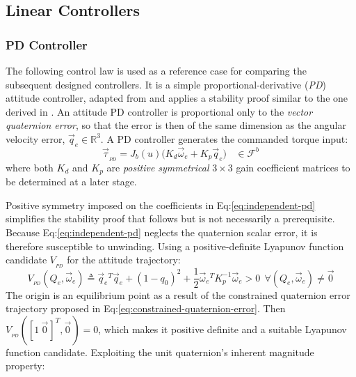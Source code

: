 \subsection{Linear Controllers}
\label{subsec:control.attitude.controllers}
\subsubsection{PD Controller}
\label{subsubsec:control.attitude.controllers.pd}
The following control law is used as a reference case for comparing the subsequent designed controllers. It is a simple proportional-derivative (\emph{PD}) attitude controller, adapted from \cite{fullquaternion} and applies a stability proof similar to the one derived in \cite{attitudecontrolproblem}. An attitude PD controller is proportional only to the \emph{vector quaternion error}, so that the error is then of the same dimension as the angular velocity error, $\vec{q}_e\in\mathbb{R}^3$. A PD controller generates the commanded torque input:
\begin{equation}\label{eq:independent-pd}
\vec{\tau}_{_{PD}}=J_b(u)\big(K_d\vec{\omega}_e+K_p\vec{q}_e\big)~~~~\in\mathcal{F}^b
\end{equation}
where both $K_d$ and $K_p$ are \emph{positive symmetrical} $3\times 3$ gain coefficient matrices to be determined at a later stage.
\par
Positive symmetry imposed on the coefficients in Eq:\ref{eq:independent-pd} simplifies the stability proof that follows but is not necessarily a prerequisite. Because Eq:\ref{eq:independent-pd} neglects the quaternion scalar error, it is therefore susceptible to unwinding. Using a positive-definite Lyapunov function candidate $V_{_{PD}}$ for the attitude trajectory:
\begin{equation}\label{eq:lyapunov-pd}
V_{_{PD}}(Q_e,\vec{\omega}_e)\triangleq\vec{q}_e\text{}^T\vec{q}_e+(1-q_0)^2+\frac{1}{2}\vec{\omega}_e\text{}^TK_p^{-1}\vec{\omega}_e>0~~\forall(Q_e,\vec{\omega}_e)\not = \vec{0}
\end{equation}
The origin is an equilibrium point as a result of the constrained quaternion error trajectory proposed in Eq:\ref{eq:constrained-quaternion-error}. Then $V_{_{PD}}([1~\vec{0}\hspace{1pt}]^T,\vec{0}\hspace{1pt})=0$, which makes it positive definite and a suitable Lyapunov function candidate. Exploiting the unit quaternion's inherent magnitude property:
